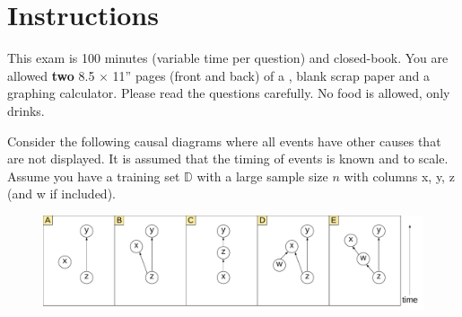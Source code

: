\documentclass[12pt,landscape]{article}
\begin{document}
\section*{Instructions}
This exam is 100 minutes (variable time per question) and closed-book. You are allowed \textbf{two} 8.5 $\times$ 11'' pages (front and back) of a , blank scrap paper and a graphing calculator. Please read the questions carefully. No food is allowed, only drinks. %

\pagebreak


\problem{} Consider the following causal diagrams where all events have other causes that are not displayed. It is assumed that the timing of events is known and to scale. Assume you have a training set $\mathbb{D}$ with a large sample size $n$ with columns x, y, z (and w if included).


\vspace{-.3cm}
\begin{figure}[htp]
\centering
\includegraphics[width=7in]{basic_causal_diagrams}
\end{figure}

\vspace{-.4cm}

\vspace{-0.3cm}\benum{} 
\end{document}
